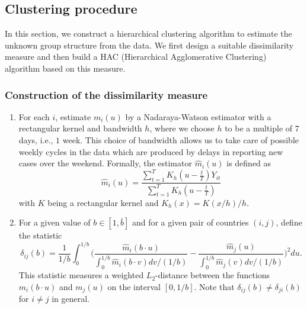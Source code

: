 \documentclass[a4paper,12pt]{article}
\numberwithin{equation}{section}
\begin{document}
\subsection{Clustering procedure}


In this section, we construct a hierarchical clustering algorithm to estimate the unknown group structure from the data. We first design a suitable dissimilarity measure and then build a HAC (Hierarchical Agglomerative Clustering) algorithm based on this measure.


\subsubsection{Construction of the dissimilarity measure}\label{subsec:diss}


\begin{enumerate}[label=\textit{Step \arabic*.},leftmargin=1.45cm]


\item For each $i$, estimate $m_i(u)$ by a Nadaraya-Watson estimator with a rectangular kernel and bandwidth $h$, where we choose $h$ to be a multiple of $7$ days, i.e., $1$ week. This choice of bandwidth allows us to take care of possible weekly cycles in the data which are produced by delays in reporting new cases over the weekend. Formally, the estimator $\hat{m}_i(u)$ is defined as
\[ \hat{m}_i(u) =  \frac{ \sum_{t=1}^T K_h(u - \frac{t}{T}) Y_{it}}{\sum_{t=1}^T K_h(u - \frac{t}{T})} \]
with $K$ being a rectangular kernel and $K_h(x) = K(x/h)/h$. 


\item For a given value of $b \in [1, \bar{b}]$ and for a given pair of countries $(i, j)$, define the statistic
\[ \delta_{ij}(b) = \frac{1}{1/b} \int_0^{1/b} \bigg( \frac{\hat{m}_i (b\cdot u)}{\int_0^{1/b} \hat{m}_i(b\cdot v) dv /(1/b)}  - \frac{\hat{m}_j (u)}{\int_0^{1/b} \hat{m}_j(v) dv /(1/b)}  \bigg)^2 du. \]
This statistic measures a weighted $L_2$-distance between the functions $m_i(b \cdot u)$ and $m_j(u)$ on the interval $[0,1/b]$. Note that $\delta_{ij}(b) \neq \delta_{ji}(b)$ for $i \neq j$ in general.



\end{enumerate}
\end{document}
